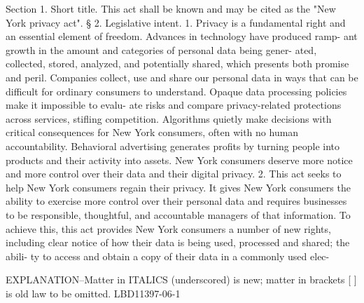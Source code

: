    Section  1.  Short  title. This act shall be known and may be cited as
 the "New York privacy act".
   § 2. Legislative intent. 1. Privacy is  a  fundamental  right  and  an
 essential element of freedom. Advances in technology have produced ramp-
 ant  growth  in  the amount and categories of personal data being gener-
 ated,  collected,  stored,  analyzed,  and  potentially  shared,   which
 presents  both  promise  and peril. Companies collect, use and share our
 personal data in ways that can be difficult for  ordinary  consumers  to
 understand. Opaque data processing policies make it impossible to evalu-
 ate  risks  and  compare  privacy-related  protections  across services,
 stifling competition. Algorithms quietly make  decisions  with  critical
 consequences for New York consumers, often with no human accountability.
 Behavioral advertising generates profits by turning people into products
 and  their  activity into assets. New York consumers deserve more notice
 and more control over their data and their digital privacy.
   2. This act seeks to help New York consumers regain their privacy.  It
 gives New York consumers the ability to exercise more control over their
 personal data and requires businesses to be responsible, thoughtful, and
 accountable managers of that information.  To  achieve  this,  this  act
 provides  New  York  consumers  a  number of new rights, including clear
 notice of how their data is being used, processed and shared; the abili-
 ty to access and obtain a copy of their data in a  commonly  used  elec-
 
  EXPLANATION--Matter in ITALICS (underscored) is new; matter in brackets
                       [ ] is old law to be omitted.
                                                            LBD11397-06-1